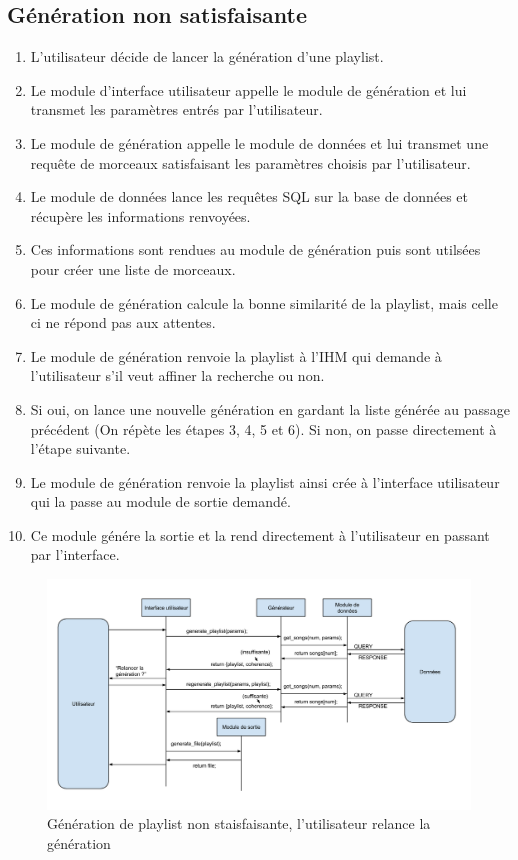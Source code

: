 \subsection{Génération non satisfaisante}
\label{scenarii:gen:nosatis}

\begin{enumerate}
\item L'utilisateur décide de lancer la génération d'une playlist.
\item Le module d'interface utilisateur appelle le module de génération et 
lui transmet les paramètres entrés par l'utilisateur.
\item Le module de génération appelle le module de données et lui transmet 
une requête de morceaux satisfaisant les paramètres choisis par l'utilisateur.
\item Le module de données lance les requêtes SQL sur la base de données et
récupère les informations renvoyées.
\item Ces informations sont rendues au module de génération puis sont 
utilsées pour créer une liste de morceaux.
\item Le module de génération calcule la bonne similarité de la playlist, 
mais celle ci ne répond pas aux attentes.
\item Le module de génération renvoie la playlist à l'IHM qui demande à 
l'utilisateur s'il veut affiner la recherche ou non.
\item Si oui, on lance une nouvelle génération en gardant la liste générée 
au passage précédent (On répète les étapes 3, 4, 5 et 6). Si non, on passe 
directement à l'étape suivante.
\item Le module de génération renvoie la playlist ainsi crée à l'interface 
utilisateur qui la passe au module de sortie demandé.
\item Ce module génére la sortie et la rend directement à l'utilisateur en 
passant par l'interface.
\end{enumerate}

\begin{figure}[!h]
\includegraphics[width=14cm]{data/generation_decevante.png}
\caption{Génération de playlist non staisfaisante, l'utilisateur relance la génération}
\end{figure}
 

